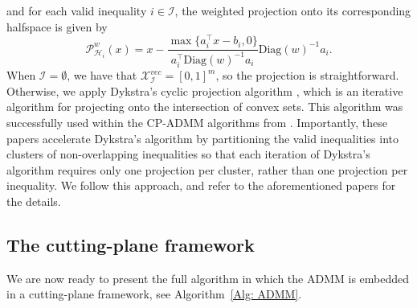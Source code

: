 \documentclass[11pt, a4paper]{article}
\newcommand{\Diag}[1]{{\text{Diag}\left(#1\right)}}
\newcommand{\mc}{\mathcal}
\begin{document}
and for each valid inequality $i \in \mc{I}$, the weighted projection onto its corresponding halfspace is given by
\begin{equation}
    \mc{P}^w_{\mc{H}_i}(x) = x - \frac{\max\{a_i^\top x - b_i, 0\}}{a_i^\top\Diag{w}^{-1} a_i} \Diag{w}^{-1}a_i. \label{eq: cut projection}
\end{equation}
When $\mc{I} = \emptyset$, we have that $\mc{X}^{vec}_\mc{I} = [0,1]^m$, so the projection is straightforward.
Otherwise, we apply Dykstra's cyclic projection algorithm \citep{Boyle1986Dykstra}, which is an iterative algorithm for projecting onto the intersection of convex sets.
This algorithm was successfully used within the CP-ADMM algorithms from \cite{deMeijer2025ADMMQMSTP, deMeijer2021QCCP, deMeijer2023ADMMPartitioning}.
Importantly, these papers accelerate Dykstra's algorithm by partitioning the valid inequalities into clusters of non-overlapping inequalities so that each iteration of Dykstra's algorithm requires only one projection per cluster, rather than one projection per inequality.
We follow this approach, and refer to the aforementioned papers for the details.

\subsection{The cutting-plane framework} \label{Sec: Cutting-plane strategy}
We are now ready to present the full algorithm in which the ADMM is embedded in a cutting-plane framework, see Algorithm~\ref{Alg: ADMM}.
\end{document}
